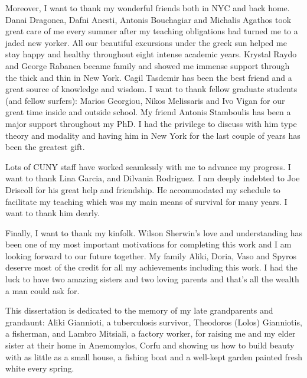 Moreover, I want to thank my wonderful friends both in NYC and back home. Danai Dragonea, Dafni Anesti, Antonis Bouchagiar 
and Michalis Agathos took great care of me every summer after my teaching obligations
had turned me to a jaded new yorker. All our beautiful excursions under the
greek sun helped me stay happy and healthy throughout eight intense academic years.
Krystal Raydo and George Rabanca became family  and showed me immense support
through the thick and thin in New York. 
Cagil Tasdemir has been the best friend and a great source of knowledge and wisdom.
I want to thank fellow graduate students (and fellow surfers): Marios Georgiou,
Nikos Melissaris and Ivo Vigan for our great time inside and outside school.
My friend Antonis Stamboulis has been a major support throughout my PhD. 
I had the privilege to discuss with him type theory and modality and having 
him in New York for the last couple of years has been 
the greatest gift. 

Lots of  CUNY staff have worked seamlessly with me to advance my progress.
I want to thank Lina Garcia, and Dilvania Rodriguez. I am deeply indebted to Joe Driscoll 
for his great help and friendship. He accommodated  my schedule to facilitate my teaching which was 
my main means of survival for many years.  I want to thank him dearly.


Finally, I want to thank my kinfolk. Wilson Sherwin's love and understanding has been one of my
most important motivations for completing this work and I am looking forward to our future together.
My family Aliki, Doria, Vaso and Spyros deserve most of the credit for all my achievements including
this work. I had the luck to have two amazing sisters and two loving parents and that's all the wealth 
a man could ask for. 

This dissertation is dedicated to the memory of my late grandparents and grandaunt: 
Aliki Giannioti, a tuberculosis survivor, Theodoros (Lolos) Gianniotis, a fisherman, and
Lambro Mitsiali, a factory  worker, for raising me and my elder sister 
at their home in Anemomylos, Corfu and showing us how to build beauty with as little as
a small house, a fishing boat and a well-kept garden painted fresh white every 
spring.